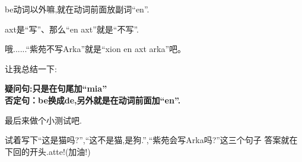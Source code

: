 be动词以外嘛,就在动词前面放副词``en''.

axt是``写''、那么``en axt''就是``不写''.


哦......``紫苑不写Arka''就是``xion en axt arka''吧。

让我总结一下:

\textbf{
疑问句:只是在句尾加``mia''\\
否定句：be换成de,另外就是在动词前面加``en''.
}

最后来做个小测试吧.

试着写下``这是猫吗?'',``这不是猫,是狗.'',``紫苑会写Arka吗?''这三个句子
答案就在下回的开头.atte!(加油!)






